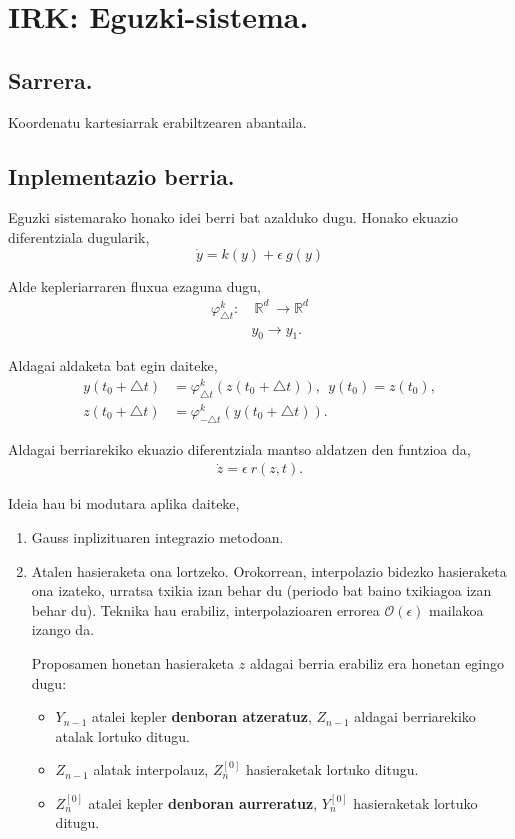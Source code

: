 \chapter{IRK: Eguzki-sistema.}

\section{Sarrera.}

Koordenatu kartesiarrak erabiltzearen abantaila.


\section{Inplementazio berria.}

Eguzki sistemarako honako idei berri bat azalduko dugu. Honako ekuazio diferentziala dugularik,
\begin{equation*}
\dot{y}=k(y)+\epsilon \ g(y)
\end{equation*}

Alde kepleriarraren fluxua ezaguna dugu,
\begin{align*}
\varphi_{\triangle t}^k:&  \ \mathbb{R}^d \ \longrightarrow \mathbb{R}^d  \\
&  y_0 \longrightarrow y_1. 
\end{align*}

Aldagai aldaketa bat egin daiteke,
\begin{align*}
y(t_0+\triangle t) &= \varphi _{\triangle t}^k(z(t_0+\triangle t)), \ \ y(t_0)=z(t_0), \\
z(t_0+\triangle t) &= \varphi _{-\triangle t}^k(y(t_0+\triangle t)).
\end{align*}

Aldagai berriarekiko ekuazio diferentziala mantso aldatzen den funtzioa da,
\begin{align*}
\dot{z}=\epsilon \ r(z,t).
\end{align*} 

Ideia hau bi modutara aplika daiteke,
\begin{enumerate}
\item Gauss inplizituaren integrazio metodoan.
\item Atalen hasieraketa ona lortzeko.
Orokorrean, interpolazio bidezko hasieraketa ona izateko,  urratsa txikia izan behar du (periodo bat baino txikiagoa izan behar du). Teknika hau erabiliz, interpolazioaren errorea $\mathcal{O}(\epsilon)$ mailakoa izango da.

Proposamen honetan hasieraketa $z$ aldagai berria erabiliz era honetan egingo dugu:
\begin{itemize}
\item $Y_{n-1}$ atalei kepler \textbf{denboran atzeratuz}, $Z_{n-1}$ aldagai berriarekiko atalak lortuko ditugu.
\item $Z_{n-1}$ alatak interpolauz, $Z_{n}^{[0]}$ hasieraketak lortuko ditugu.
\item $Z_{n}^{[0]}$ atalei kepler \textbf{denboran aurreratuz}, $Y_{n}^{[0]}$ hasieraketak lortuko ditugu.
\end{itemize}


\end{enumerate}


